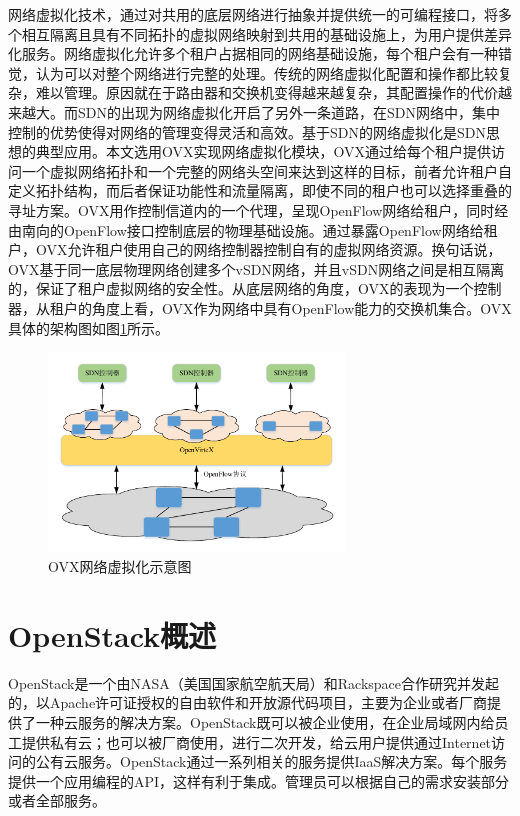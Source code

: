 网络虚拟化技术\cite{Virtual-1}，通过对共用的底层网络进行抽象并提供统一的可编程接口，将多个相互隔离且具有不同拓扑的虚拟网络映射到共用的基础设施上，为用户提供差异化服务。网络虚拟化允许多个租户占据相同的网络基础设施，每个租户会有一种错觉，认为可以对整个网络进行完整的处理。传统的网络虚拟化配置和操作都比较复杂，难以管理。原因就在于路由器和交换机变得越来越复杂，其配置操作的代价越来越大。而SDN的出现为网络虚拟化开启了另外一条道路，在SDN网络中，集中控制的优势使得对网络的管理变得灵活和高效。基于SDN的网络虚拟化是SDN思想的典型应用。本文选用OVX实现网络虚拟化模块，OVX通过给每个租户提供访问一个虚拟网络拓扑和一个完整的网络头空间来达到这样的目标，前者允许租户自定义拓扑结构，而后者保证功能性和流量隔离，即使不同的租户也可以选择重叠的寻址方案。OVX用作控制信道内的一个代理，呈现OpenFlow网络给租户，同时经由南向的OpenFlow接口控制底层的物理基础设施。通过暴露OpenFlow网络给租户，OVX允许租户使用自己的网络控制器控制自有的虚拟网络资源。换句话说，OVX基于同一底层物理网络创建多个vSDN网络，并且vSDN网络之间是相互隔离的，保证了租户虚拟网络的安全性。从底层网络的角度，OVX的表现为一个控制器，从租户的角度上看，OVX作为网络中具有OpenFlow能力的交换机集合\cite{OVX-2}。OVX具体的架构图如图\ref{fig:ovx}所示。

\begin{figure}[!htb]
  \centering
  \includegraphics[width=0.7\textwidth]{logo/ovx}
  \caption{OVX网络虚拟化示意图}
  \label{fig:ovx}
\end{figure}

\section{OpenStack概述}

OpenStack是一个由NASA（美国国家航空航天局）和Rackspace合作研究并发起的，以Apache许可证授权的自由软件和开放源代码项目，主要为企业或者厂商提供了一种云服务的解决方案\cite{OpenStack-5}。OpenStack既可以被企业使用，在企业局域网内给员工提供私有云；也可以被厂商使用，进行二次开发，给云用户提供通过Internet访问的公有云服务。OpenStack通过一系列相关的服务提供IaaS解决方案。每个服务提供一个应用编程的API，这样有利于集成。管理员可以根据自己的需求安装部分或者全部服务\cite{OpenStack-6}。

